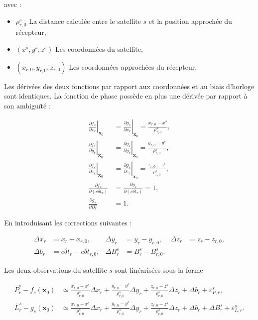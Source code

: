 avec :

\begin{itemize}
    \item $\rho_{r,0}^s$ La distance calculée entre le satellite $s$ et la
    position approchée du récepteur,
    \item $(x^s,y^s,z^s)$ Les coordonnées du satellite,
    \item $(x_{r,0},y_{r,0},z_{r,0})$ Les coordonnées approchées du
    récepteur.
\end{itemize}

Les dérivées des deux fonctions par rapport aux coordonnées et au biais
d'horloge sont identiques. La fonction de phase possède en plus une dérivée
par rapport à son ambiguïté :

\begin{align}
\left.\frac{\partial f_s}{\partial x_r}\right|_{\mathbf x_0}
&=
\left.\frac{\partial g_s}{\partial x_r}\right|_{\mathbf x_0}
=\frac{x_{r,0}-x^s}{\rho_{r,0}^s},
\\
\left.\frac{\partial f_s}{\partial y_r}\right|_{\mathbf x_0}
&=
\left.\frac{\partial g_s}{\partial y_r}\right|_{\mathbf x_0}
=\frac{y_{r,0}-y^s}{\rho_{r,0}^s},
\\
\left.\frac{\partial f_s}{\partial z_r}\right|_{\mathbf x_0}
&=
\left.\frac{\partial g_s}{\partial z_r}\right|_{\mathbf x_0}
=\frac{z_{r,0}-z^s}{\rho_{r,0}^s},
\\
\frac{\partial f_s}{\partial(c\delta t_r)}
&=
\frac{\partial g_s}{\partial(c\delta t_r)}=1,
\\
\frac{\partial g_s}{\partial B_r^s}
&=1.
\label{ann:eq:component_observation_derivatives}
\end{align}


En introduisant les corrections suivantes :

\begin{align}
\Delta x_r&=x_r-x_{r,0},
&
\Delta y_r&=y_r-y_{r,0},
&
\Delta z_r&=z_r-z_{r,0},
\\
\Delta b_r&=c\delta t_r-c\delta t_{r,0},
&
\Delta B_r^s&=B_r^s-B_{r,0}^s.
\label{ann:eq:state_component_corrections}
\end{align}

Les deux observations du satellite $s$ sont linéarisées sous la forme

\begin{align}
\overline P_r^s-f_s(\mathbf x_0)
&\simeq
\frac{x_{r,0}-x^s}{\rho_{r,0}^s}\Delta x_r
+\frac{y_{r,0}-y^s}{\rho_{r,0}^s}\Delta y_r
+\frac{z_{r,0}-z^s}{\rho_{r,0}^s}\Delta z_r
+\Delta b_r+\varepsilon_{P,r}^s,
\\
\overline L_r^s-g_s(\mathbf x_0)
&\simeq
\frac{x_{r,0}-x^s}{\rho_{r,0}^s}\Delta x_r
+\frac{y_{r,0}-y^s}{\rho_{r,0}^s}\Delta y_r
+\frac{z_{r,0}-z^s}{\rho_{r,0}^s}\Delta z_r
+\Delta b_r+\Delta B_r^s+\varepsilon_{L,r}^s.
\label{ann:eq:component_linearized_observations}
\end{align}

